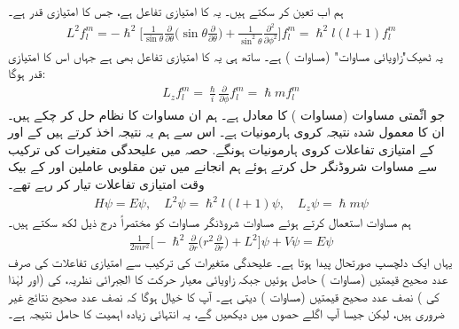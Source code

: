 ہم اب  تعین کر سکتے ہیں۔  یہ  کا امتیازی تفاعل ہے،  جس کا  امتیازی قدر  ہے۔
\begin{align*}
L^2 f_l^m = - \hslash^2 \big [ \frac{1}{\sin \theta} \frac{\partial}{\partial \theta} \big ( \sin \theta \frac{\partial}{\partial \theta} \big ) + \frac{1}{\sin^2 \theta} \frac{\partial^2}{\partial \phi^2} \big ] f_l^m = \hslash^2 l (l + 1) f_l^m
\end{align*}
یہ ٹھیک"زاویائی مساوات" (مساوات  )  ہے۔ ساتھ ہی یہ  کا امتیازی تفاعل بھی ہے جہاں اس کا امتیازی قدر  ہوگا: 
\begin{align*}
L_z f_l^m = \frac{\hslash}{i} \frac{\partial}{\partial \phi} f_l^m = \hslash m f_l^m
\end{align*}
جو اثّمتی  مساوات (مساوات )  کا معادل ہے۔ ہم ان مساوات کا نظام حل کر چکے ہیں۔ ان کا معمول شدہ نتیجہ کروی ہارمونیات  ہے۔  اس سے ہم یہ نتیجہ اخذ کرتے ہیں کے  اور  کے امتیازی تفاعلات کروی ہارمونیات ہونگے. حصہ   میں علیحدگی متغیرات کی ترکیب سے مساوات شروڈنگر حل کرتے ہوئے ہم  انجانے میں تین مقلوبی عاملین   اور  کے بیک وقت امتیازی تفاعلات تیار کر رہے تھے۔ 
\begin{align}
H \psi = E \psi , \quad L^2 \psi = \hslash^2 l (l + 1) \psi , \quad L_z \psi = \hslash m \psi
\end{align}
ہم مساوات   استعمال کرتے ہوئے مساوات شروڈنگر مساوات کو مختصراً  درج ذیل لکھ سکتے ہیں۔ 
\begin{align*}
\frac{1}{2m r^2} \big [ - \hslash^2 \frac{\partial}{\partial r} \big ( r^2 \frac{\partial}{\partial r} \big ) + L^2 \big ]  \psi + V \psi = E \psi
\end{align*}
یہاں ایک دلچسپ صورتحال پیدا ہوتا ہے۔ علیحدگی متغیرات کی ترکیب سے امتیازی تفاعلات کی صرف عدد صحیح  قیمتیں (مساوات )  حاصل ہوئیں جبکہ زاویائی معیار حرکت کا الجبرائی نظریہ،   کی (اور لہٰذا  کی )   نصف عدد صحیح قیمتیں (مساوات )  دیتی ہے۔ آپ کا خیال ہوگا کہ نصف عدد صحیح نتائج غیر ضروری ہیں، لیکن جیسا آپ اگلے حصوں میں دیکھیں گے،  یہ انتہائی زیادہ اہمیت کا حامل نتیجہ  ہے۔ 

